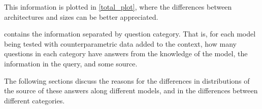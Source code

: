
This information is plotted in \cref{total_plot}, where the differences between architectures and sizes can be better appreciated.

 contains the information separated by question category.
That is, for each model being tested with counterparametric data added to the context, how many questions in each category have answers from the \Parametric{} knowledge of the model, the \Contextual{} information in the query, and some \Other{} source.

The following sections discuss the reasons for the differences in distributions of the source of these answers along different models, and in the differences between different categories.

